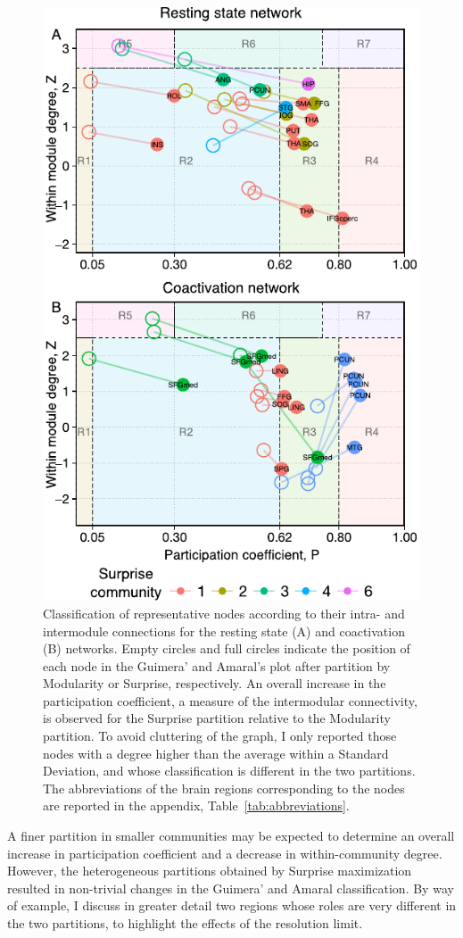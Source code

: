 \begin{figure}[ht!]
\centering
\includegraphics[width=0.5\linewidth]{images/figure_6_ga_rs_coact.pdf}
\caption{Classification of representative nodes according to their intra- and intermodule connections for the resting state (A) and coactivation (B) networks. Empty circles and full circles indicate the position of each node in the Guimera' and Amaral’s plot after partition by Modularity or Surprise, respectively. An overall increase in the participation coefficient, a measure of the intermodular connectivity, is observed for the Surprise partition relative to the Modularity partition. To avoid cluttering of the graph, I only reported those nodes with a degree higher than the average within a Standard Deviation, and whose classification is different in the two partitions. The abbreviations of the brain regions corresponding to the nodes are reported in the appendix, Table~\ref{tab:abbreviations}.}
\label{fig:figure_6_ga_rs_coact}
\end{figure}

A finer partition in smaller communities may be expected to determine an overall increase in participation coefficient and a decrease in within-community degree. However, the heterogeneous partitions obtained by Surprise maximization resulted in non-trivial changes in the Guimera' and Amaral classification. By way of example, I discuss in greater detail two regions whose roles are very different in the two partitions, to highlight the effects of the resolution limit.

